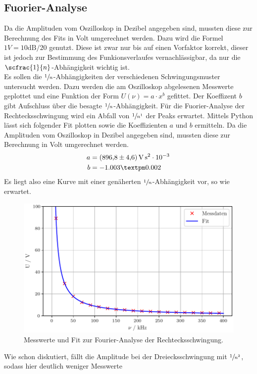 \subsection{Fuorier-Analyse}
Da die Amplituden vom Oszilloskop in Dezibel angegeben sind, mussten diese zur Berechnung des Fits in Volt umgerechnet werden.
Dazu wird die Formel $1V=10{\text{dB}/20}$ genutzt. Diese ist zwar nur bis auf einen Vorfaktor korrekt, dieser ist jedoch zur Bestimmung
des Funkionsverlaufes vernachlässigbar, da nur die $\scfrac{1}{n}$-Abhängigkeit wichtig ist.\\
Es sollen die $\sfrac{1}{n}$-Abhängigkeiten der verschiedenen Schwingungsmuster untersucht werden. Dazu werden die am Oszilloskop 
abgelesenen Messwerte geplottet und eine Funktion der Form $U(\nu)=a\cdot x^b$ gefittet. Der Koeffizent $b$ gibt Aufschluss über die 
besagte $\sfrac{1}{n}$-Abhängigkeit. Für die Fuorier-Analyse der Rechtecksschwingung wird ein Abfall von $\sfrac{1}{n^1}$ der Peaks
erwartet.
Mittels Python lässt sich folgender Fit plotten sowie die Koeffizienten $a$ und $b$ ermitteln.
Da die Amplituden vom Oszilloskop in Dezibel angegeben sind, mussten diese zur Berechnung in Volt umgerechnet werden.
\begin{align*}
  a &= \SI{896.8 +- 4.6}{\volt\second\squared}\cdot10^{-3}\, \\
  b &= -1.003 ± 0.002
\end{align*}
Es liegt also eine Kurve mit einer genäherten $\sfrac{1}{n}$-Abhängigkeit vor, so wie erwartet.
\begin{figure}[H]
  \centering
  \includegraphics[scale=0.6]{plota.pdf}
  \caption{Messwerte und Fit zur Fourier-Analyse der Rechtecksschwingung.}
  \label{fig:Plot1}
\end{figure}\noindent
Wie schon diskutiert, fällt die Amplitude bei der Dreiecksschwingung mit $\sfrac{1}{n^2}$, sodass hier deutlich weniger Messwerte
